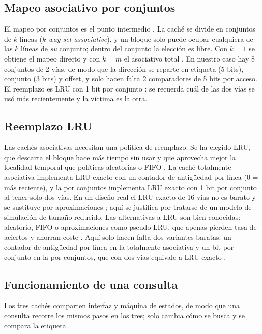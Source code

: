 \documentclass[llncs]{llncs}
\begin{document}
\subsection{Mapeo asociativo por conjuntos}

El mapeo por conjuntos es el punto intermedio \cite{stallings2019}.
La caché se divide en conjuntos de $k$ líneas (\emph{$k$-way
set-associative}), y un bloque solo puede ocupar cualquiera de las
$k$ líneas de \emph{su} conjunto; dentro del conjunto la elección es
libre. Con $k=1$ se obtiene el mapeo directo y con $k=m$ el asociativo
total \cite{stallings2019,patterson2017}. En nuestro caso hay 8
conjuntos de 2 vías, de modo que la dirección se reparte en etiqueta
(5 bits), conjunto (3 bits) y offset, y solo hacen falta 2
comparadores de 5 bits por acceso. El reemplazo es LRU con 1 bit por
conjunto \cite{wikipedia-cpu-cache}: se recuerda cuál de las dos vías se usó
más recientemente y la víctima es la otra.

\subsection{Reemplazo LRU}

Las cachés asociativas necesitan una política de reemplazo. Se ha
elegido LRU, que descarta el bloque hace más tiempo sin usar y que
aprovecha mejor la localidad temporal que políticas aleatorias o FIFO
\cite{stallings2019,hennessy2019,wikipedia-replacement}. La caché totalmente
asociativa
implementa LRU exacto con un contador de antigüedad por línea (0 =
más reciente), y la por conjuntos implementa LRU exacto con 1 bit por
conjunto al tener solo dos vías. En un diseño real el LRU exacto de
16 vías no es barato y se sustituye por aproximaciones
\cite{hennessy2019}; aquí se justifica por tratarse de un modelo de
simulación de tamaño reducido. Las alternativas a LRU son bien
conocidas: aleatorio, FIFO o aproximaciones como pseudo-LRU, que
apenas pierden tasa de aciertos y ahorran coste
\cite{hennessy2019,wikipedia-replacement}. Aquí solo hacen falta dos
variantes baratas: un contador de antigüedad por línea en la
totalmente asociativa y un bit por conjunto en la por conjuntos, que
con dos vías equivale a LRU exacto \cite{wikipedia-cpu-cache}.

\subsection{Funcionamiento de una consulta}

Los tres cachés comparten interfaz y máquina de estados, de modo que
una consulta recorre los mismos pasos en los tres; solo cambia cómo
se busca y se compara la etiqueta.
\end{document}
